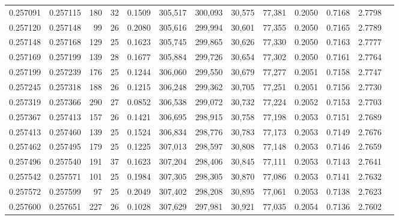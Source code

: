 \begin{tabular}{rrrrrrrrrrrrr}
0.257091 & 0.257115 &   180 &  32 &                                     0.1509 & 305,517 & 300,093 &  30,575 &  77,381 & 0.2050 & 0.7168 & 2.7798 \\
0.257120 & 0.257148 &    99 &  26 &                                     0.2080 & 305,616 & 299,994 &  30,601 &  77,355 & 0.2050 & 0.7165 & 2.7789 \\
0.257148 & 0.257168 &   129 &  25 &                                     0.1623 & 305,745 & 299,865 &  30,626 &  77,330 & 0.2050 & 0.7163 & 2.7777 \\
0.257169 & 0.257199 &   139 &  28 &                                     0.1677 & 305,884 & 299,726 &  30,654 &  77,302 & 0.2050 & 0.7161 & 2.7764 \\
0.257199 & 0.257239 &   176 &  25 &                                     0.1244 & 306,060 & 299,550 &  30,679 &  77,277 & 0.2051 & 0.7158 & 2.7747 \\
0.257245 & 0.257318 &   188 &  26 &                                     0.1215 & 306,248 & 299,362 &  30,705 &  77,251 & 0.2051 & 0.7156 & 2.7730 \\
0.257319 & 0.257366 &   290 &  27 &                                     0.0852 & 306,538 & 299,072 &  30,732 &  77,224 & 0.2052 & 0.7153 & 2.7703 \\
0.257367 & 0.257413 &   157 &  26 &                                     0.1421 & 306,695 & 298,915 &  30,758 &  77,198 & 0.2053 & 0.7151 & 2.7689 \\
0.257413 & 0.257460 &   139 &  25 &                                     0.1524 & 306,834 & 298,776 &  30,783 &  77,173 & 0.2053 & 0.7149 & 2.7676 \\
0.257462 & 0.257495 &   179 &  25 &                                     0.1225 & 307,013 & 298,597 &  30,808 &  77,148 & 0.2053 & 0.7146 & 2.7659 \\
0.257496 & 0.257540 &   191 &  37 &                                     0.1623 & 307,204 & 298,406 &  30,845 &  77,111 & 0.2053 & 0.7143 & 2.7641 \\
0.257542 & 0.257571 &   101 &  25 &                                     0.1984 & 307,305 & 298,305 &  30,870 &  77,086 & 0.2053 & 0.7141 & 2.7632 \\
0.257572 & 0.257599 &    97 &  25 &                                     0.2049 & 307,402 & 298,208 &  30,895 &  77,061 & 0.2053 & 0.7138 & 2.7623 \\
0.257600 & 0.257651 &   227 &  26 &                                     0.1028 & 307,629 & 297,981 &  30,921 &  77,035 & 0.2054 & 0.7136 & 2.7602 \\

\end{tabular}
